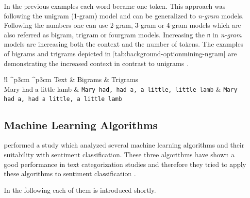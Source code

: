 In the previous examples each word became one token.
This approach was following the unigram (1-gram) model and can be generalized to \emph{n-gram} models.
Following the numbers one can use 2-gram, 3-gram or 4-gram models which are also referred as bigram, trigram or fourgram models.
Increasing the \texttt{n} in \emph{n-gram} models are increasing both the context and the number of tokens.
The examples of bigrams and trigrams depicted in \cref{tab:background-optionmining-ngram} are demonstrating the increased context in contrast to unigrams
\citep[p.193f]{Manning1999}.

\begin{table}[htbp]
	\begin{center}
		\begin{tabular}{!l ^p{3cm} ^p{3cm}}
			\hline
			\rowstyle{\bfseries}
			Text & Bigrams & Trigrams \\ \hline
			Mary had a little lamb & \texttt{Mary had, had a, a little, little lamb} & \texttt{Mary had a, had a little, a little lamb} \\ \hline
		\end{tabular}

        \caption{An example of bigrams and trigrams}
		\label{tab:background-optionmining-ngram}
	\end{center}
\end{table}


\subsection{Machine Learning Algorithms}
\label{ss:background-optionmining-machinelearningalgorithms}

\citeauthor{Pang2002} performed a study which analyzed several machine learning algorithms and their suitability with sentiment classification.
These three algorithms have shown a good performance in text categorization studies and therefore they tried to apply these algorithms to sentiment classification \citep{Pang2002}.

In the following each of them is introduced shortly.

